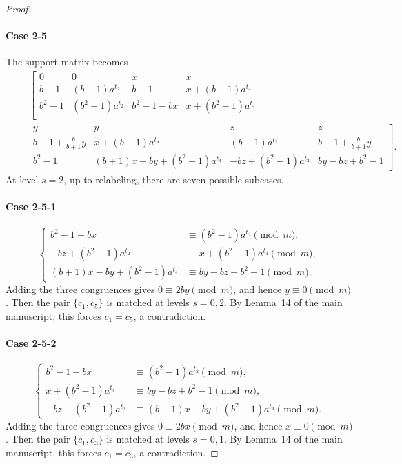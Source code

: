 \documentclass[11pt]{article}
\newcommand{\mymod}{\pmod{m}}
\begin{document}
\begin{proof}
\paragraph{Case 2-5}
The support matrix becomes
\begin{eqnarray*}
		~&~&\left[\begin{array}{cccc}
			0 & 0 &
			x & x \\
            b-1 & (b-1)a^{t_2} &
			b-1 & x+(b-1)a^{t_4} \\
            b^2-1 & (b^2-1)a^{t_2} &
			b^2-1-bx & x+(b^2-1)a^{t_4} \\
            \end{array}
            \right.\\
            ~&~& \left. \begin{array}{cccc}  
			y & y &
			z & z \\			
			b-1+\frac{b}{b+1}y & x+(b-1)a^{t_4} &
			(b-1)a^{t_2} & b-1+\frac{b}{b+1}y \\			
			b^2-1 & (b+1)x-by+(b^2-1)a^{t_4} &
			-bz+(b^2-1)a^{t_2} & by-bz+b^2-1
        \end{array}
        \right]
        .
\end{eqnarray*}
At level $s=2$, up to relabeling, there are seven possible subcases.

\paragraph{Case 2-5-1}
$$
\begin{cases}
b^2-1-bx &\equiv (b^2-1)a^{t_2}\mymod, \\
-bz+(b^2-1)a^{t_2} &\equiv x+(b^2-1)a^{t_4}\mymod, \\
(b+1)x-by+(b^2-1)a^{t_4} &\equiv by-bz+b^2-1\mymod.
\end{cases}
$$
Adding the three congruences gives $0\equiv2by\mymod$, and hence
$y\equiv0\mymod$. Then the pair $\{c_1,c_5\}$ is matched at levels $s=0,2$. By Lemma~14 of the main manuscript, this forces $c_1=c_5$, a
contradiction.

\paragraph{Case 2-5-2}
$$
\begin{cases}
    b^2-1-bx &\equiv (b^2-1)a^{t_2}\mymod,\\
    x+(b^2-1)a^{t_4} &\equiv by-bz+b^2-1\mymod,\\
	-bz+(b^2-1)a^{t_2} &\equiv (b+1)x-by+(b^2-1)a^{t_4}\mymod.
\end{cases}
$$
Adding the three congruences gives $0\equiv2bx\mymod$, and hence
$x\equiv0\mymod$. Then the pair $\{c_1,c_3\}$ is matched at levels $s=0,1$. By Lemma~14 of the main manuscript, this forces $c_1=c_3$, a
contradiction.


\end{proof}
\end{document}

